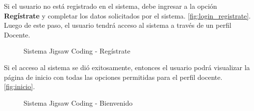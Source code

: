 Si el usuario no está registrado en el sistema, debe ingresar a la opción \textbf{Regístrate} y completar los datos solicitados por el sistema. \autoref{fig:login_registrate}. Luego de este paso, el usuario tendrá acceso al sistema a través de un perfil Docente.\\

\begin{figure}
	\centering
	\caption[SJC Registrate]{Sistema Jigsaw Coding - Regístrate}
	\label{fig:login_registrate}
\end{figure}

Si el acceso al sistema se dió exitosamente, entonces el usuario podrá visualizar la página de inicio con todas las opciones permitidas para el perfil docente. \autoref{fig:inicio}.

\begin{figure}
\centering
\caption[SJC Inicio]{Sistema Jigsaw Coding - Bienvenido}
\label{fig:inicio}
\end{figure}

